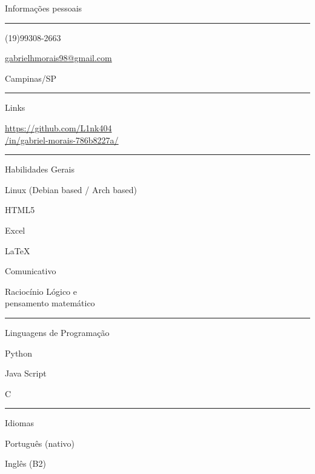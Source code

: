 \documentclass{letter}
\begin{document}
\begin{minipage}[t]{0.40\textwidth}
\setlength{\baselineskip}{1.5\baselineskip}
\color{white}
\vspace{1cm}
{\large Informações pessoais}

\rule{\linewidth}{0.4pt}

\faPhone \quad (19)99308-2663


\faEnvelope \quad \href{somelink.com}{gabrielhmorais98@gmail.com}


\faMapMarker \quad Campinas/SP

\rule{\linewidth}{0.4pt}

{\large Links}


\faGithub \quad \href{github.com}{https://github.com/L1nk404}\\
 \quad \href{linkedin}{/in/gabriel-morais-786b8227a/}

\rule{\linewidth}{0.4pt}

{\large Habilidades Gerais}

\faLinux\quad Linux (Debian based / Arch based)

 \quad HTML5

\faCircleNotch \quad Excel

\faCircleNotch \quad LaTeX

\faCircleNotch \quad Comunicativo

\faCircleNotch \quad Raciocínio Lógico e \\ pensamento matemático

\rule{\linewidth}{0.4pt}

{\large Linguagens de Programação}

\faPython \quad Python

\faJs \quad Java Script

\faCircleNotch \quad C



\rule{\linewidth}{0.4pt}

{\large Idiomas}

\faLanguage \quad Português (nativo)

\faLanguage \quad Inglês (B2)



\end{minipage}
\hfill
\end{document}
